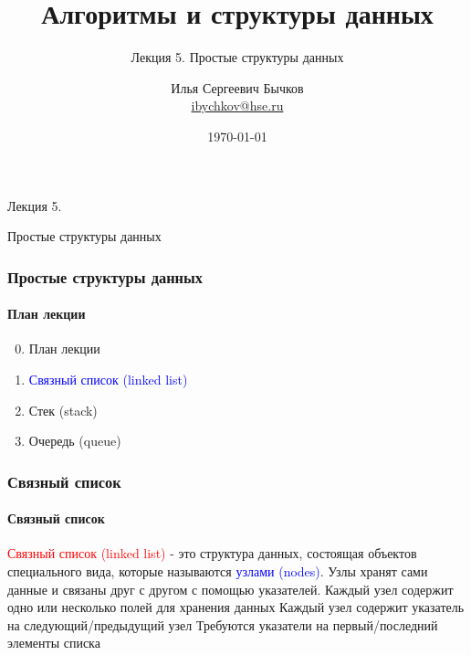 \documentclass[aspectratio=169]{beamer}
\title[Title]{Алгоритмы и структуры данных}
\subtitle{Лекция 5. Простые структуры данных}
\author[Author's name]{Илья Сергеевич Бычков\\ \smallskip \scriptsize \url{ibychkov@hse.ru}}
\institute{НИУ ВШЭ - Нижний Новгород}
\date{\today}
\begin{document}
\frame[plain]{\titlepage}

\begin{frame}[c]

\begin{center}
\Huge Лекция 5.

\Huge Простые структуры данных
\end{center}

\end{frame}

\begin{frame}
\frametitle{Простые структуры данных}
\framesubtitle{План лекции}

\begin{enumerate}
  \setcounter{enumi}{-1}
  \item{План лекции}
  \item{\textcolor{blue}{Связный список (linked list)}}
  \item{Стек (stack)}
  \item{Очередь (queue)}
\end{enumerate}
\end{frame}



\begin{frame}
\frametitle{Связный список}
\framesubtitle{Связный список}
\justifying
\textcolor{red}{Связный список (linked list)} - это структура данных, состоящая  объектов специального вида, которые называются  \textcolor{blue}{узлами (nodes)}. Узлы хранят сами данные и связаны друг с другом с помощью указателей.\newline\newline
Каждый узел содержит одно или несколько полей для хранения данных\newline\newline
Каждый узел содержит указатель на следующий/предыдущий узел\newline\newline
Требуются указатели на первый/последний элементы списка\newline\newline
\end{frame}
\end{document}
